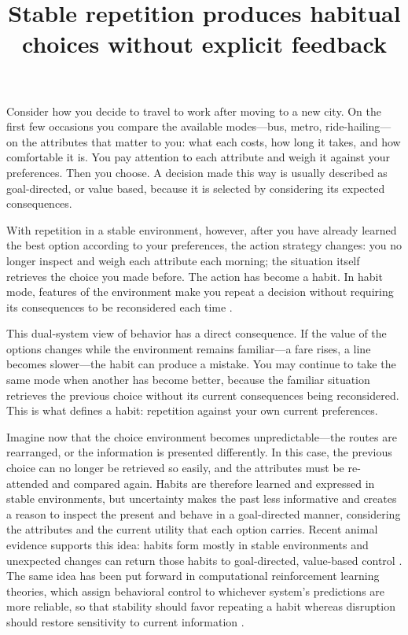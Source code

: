 \documentclass[man,natbib,floatsintext]{apa7}
\title{Stable repetition produces habitual choices without explicit feedback}
\begin{document}
\maketitle

Consider how you decide to travel to work after moving to a new city. On the first few occasions you compare the available modes---bus, metro, ride-hailing---on the attributes that matter to you: what each costs, how long it takes, and how comfortable it is. You pay attention to each attribute and weigh it against your preferences. Then you choose. A decision made this way is usually described as goal-directed, or value based, because it is selected by considering its expected consequences. 

With repetition in a stable environment, however, after you have already learned the best option according to your preferences, the action strategy changes: you no longer inspect and weigh each attribute each morning; the situation itself retrieves the choice you made before. The action has become a habit. In habit mode, features of the environment make you repeat a decision without requiring its consequences to be reconsidered each time \citep{wood2002,buyalskaya2023can}.

This dual-system view of behavior has a direct consequence. If the value of the options changes while the environment remains familiar---a fare rises, a line becomes slower---the habit can produce a mistake. You may continue to take the same mode when another has become better, because the familiar situation retrieves the previous choice without its current consequences being reconsidered. This is what defines a habit: repetition against your own current preferences. 

Imagine now that the choice environment becomes unpredictable---the routes are rearranged, or the information is presented differently. In this case, the previous choice can no longer be retrieved so easily, and the attributes must be re-attended and compared again. Habits are therefore learned and expressed in stable environments, but uncertainty makes the past less informative and creates a reason to inspect the present and behave in a goal-directed manner, considering the attributes and the current utility that each option carries. Recent animal evidence supports this idea: habits form mostly in stable environments \citep{thrailkill2018} and unexpected changes can return those habits to goal-directed, value-based control \citep{bouton2020,bouton2024}. The same idea has been put forward in computational reinforcement learning theories, which assign behavioral control to whichever system's predictions are more reliable, so that stability should favor repeating a habit whereas disruption should restore sensitivity to current information \citep{daw2005,lee2014}.
\end{document}

